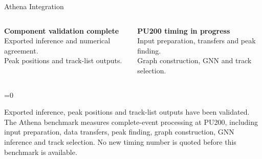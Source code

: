 \documentclass[xcolor=table,aspectratio=169]{beamer}
\providecommand{\talkbuild}{0}
\newcommand{\readingonly}[1]{\ifnum\talkbuild=0\relax#1\fi}
\newcommand{\readingnote}[1]{\readingonly{\par\vspace{.35em}%
  {\footnotesize\color{black!65}#1\par}}}
\newcommand{\takeaway}[1]{\par\vspace{.65em}{\centering
  \setlength{\fboxsep}{7pt}\colorbox{pennred!5}{\parbox{.94\linewidth}{%
  \centering\small\textcolor{pennred}{#1}}}\par}}
\begin{document}
\begin{frame}{Athena Integration}
\relax

\centering
{}
\par\vspace{.9em}
\begin{columns}[t]
\begin{column}{.45\linewidth}\textbf{Component validation complete}\\[.6em]\small
Exported inference and numerical agreement.\\[.5em]
Peak positions and track-list outputs.
\end{column}
\begin{column}{.45\linewidth}\textbf{PU200 timing in progress}\\[.6em]\small
Input preparation, transfers and peak finding.\\[.5em]
Graph construction, GNN and track selection.
\end{column}\end{columns}
\takeaway{Validated components; full-event PU200 timing is being benchmarked within Athena.}\readingnote{Exported inference, peak positions and track-list outputs have been validated. The Athena benchmark measures complete-event processing at PU200, including input preparation, data transfers, peak finding, graph construction, GNN inference and track selection. No new timing number is quoted before this benchmark is available.}
\end{frame}
\end{document}
